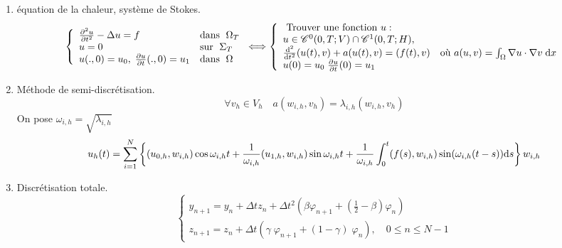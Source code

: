 \documentclass{article}
\def \de {{\rm d}}
\begin{document}
\begin{itemize}[label=\textbullet, font=\small \color{blue}]
\begin{enumerate}
\item équation de la chaleur, système de Stokes. 
\[\left\{\begin{array}{ll}
\frac{\partial^2 u}{\partial t^2}-\Delta u = f &\mbox{dans }\; \Omega_T\\
u=0 &\mbox{sur }\; \Sigma_T\\
u(.,0)=u_0,\; \frac{\partial u}{\partial t} (.,0)=u_1&\mbox{dans }\; \Omega
\end{array}\right. \Longleftrightarrow \left\{\begin{array}{ll}
\mbox{ Trouver une fonction } u :&\\
u\in  {\cal C}^0(0,T;V)\cap {\cal C}^1(0,T;H), & \\
\frac{\de^2}{\de t^2}(u(t),v)+a(u(t),v)=(f(t),v) & \mbox{où } a(u,v)=\int_\Omega \nabla u\cdot \nabla v \; \de x\\
u(0)=u_0\; \frac{\partial u}{\partial t} (0)=u_1 &
\end{array}\right.\]
\item  Méthode de semi-discrétisation.
\[\forall v_h\in V_h \quad a(w_{i,h},v_h)=\lambda_{i,h} (w_{i,h},v_h)\]
On pose $\omega_{i,h}=\sqrt{\lambda_{i,h}}$
\[u_h(t)=\sum_{i=1}^N\left\{(u_{0,h},w_{i,h})\cos\omega_{i,h}t+\frac{1}{\omega_{i,h}}(u_{1,h},w_{i,h})\sin\omega_{i,h}t+\frac{1}{\omega_{i,h}}\int_0^t(f(s),w_{i,h})\sin(\omega_{i,h}(t-s))\de s\right\}w_{i,h}\]
\item  Discrétisation totale.
\[\left\{\begin{array}{l}
y_{n+1}=y_n+\Delta t z_n+\Delta t^2\left(\beta \varphi_{n+1}+\left(\frac 12-\beta\right)\varphi_n\right)\\
z_{n+1}=z_n+\Delta t (\gamma\;\varphi_{n+1}+(1-\gamma)\;\varphi_{n}),\quad 0\leq n\leq N-1
\end{array} \right.\]

\end{enumerate}


\end{itemize}
\end{document}

